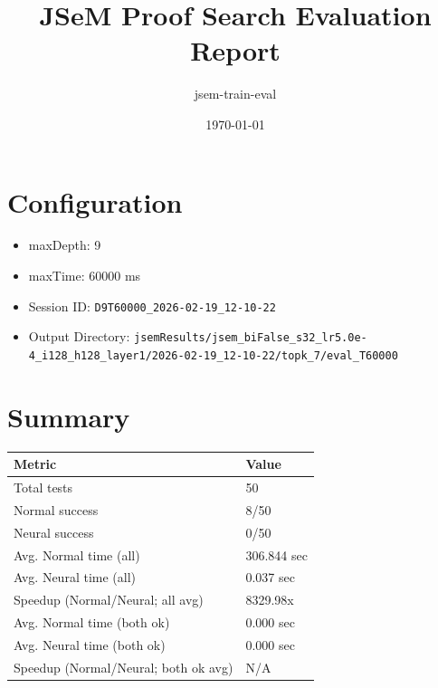 \documentclass[a4paper,10pt]{article}
\title{JSeM Proof Search Evaluation Report}
\author{jsem-train-eval}
\date{\today}
\begin{document}
\maketitle

\section{Configuration}
\begin{itemize}
\item maxDepth: 9
\item maxTime: 60000 ms
\item Session ID: \texttt{D9T60000\_2026-02-19\_12-10-22}
\item Output Directory: \texttt{jsemResults/jsem\_biFalse\_s32\_lr5.0e-4\_i128\_h128\_layer1/2026-02-19\_12-10-22/topk\_7/eval\_T60000}
\end{itemize}

\section{Summary}
\begin{tabular}{ll}
\toprule
\textbf{Metric} & \textbf{Value} \\
\midrule
Total tests & 50 \\
Normal success & 8/50 \\
Neural success & 0/50 \\
\midrule
Avg. Normal time (all) & 306.844 sec \\
Avg. Neural time (all) & 0.037 sec \\
Speedup (Normal/Neural; all avg) & 8329.98x \\
Avg. Normal time (both ok) & 0.000 sec \\
Avg. Neural time (both ok) & 0.000 sec \\
Speedup (Normal/Neural; both ok avg) & N/A \\
\bottomrule
\end{tabular}
\end{document}
